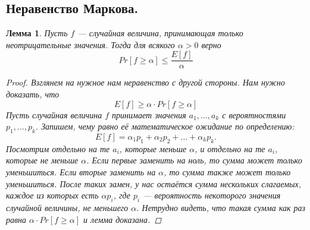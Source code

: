\documentclass{article}
\newtheorem{lemma}{Лемма}
\begin{document}
\subsection{Неравенство Маркова.}
\begin{lemma}
Пусть $f$ — случайная величина, принимающая
только неотрицательные значения. Тогда для всякого $\alpha > 0$ верно
\[
Pr[f \geqslant \alpha] \leqslant
\frac{E[f]}{\alpha}
\]
\begin{proof}
Взглянем на нужное нам неравенство с другой стороны. Нам нужно доказать, что
\[
E[f] \geqslant \alpha \cdot Pr[f \geqslant \alpha]
\]
Пусть случайная величина $f$ принимает значения $a_1, ..., a_k$ с вероятностями $p_1,...,p_k$. Запишем, чему равно её математическое ожидание по определению:
\[
E[f] = \alpha_1 p_1 + \alpha_2 p_2 + ... + \alpha_k p_k.
\]
Посмотрим отдельно на те $a_i$, которые меньше $\alpha$, и отдельно на те $a_i$, которые не меньше $\alpha$. Если первые заменить на ноль, то сумма может только уменьшиться. Если вторые заменить на $\alpha$, то сумма также может только уменьшиться. После таких замен, у нас остаётся сумма нескольких слагаемых, каждое из которых есть $\alpha p_i$, где $p_i$ — вероятность некоторого значения случайной величины, не меньшего $\alpha$. Нетрудно видеть, что такая сумма как раз равна $\alpha \cdot Pr[f \geqslant \alpha]$ и лемма доказана.
\end{proof}
\end{lemma}
\end{document}
